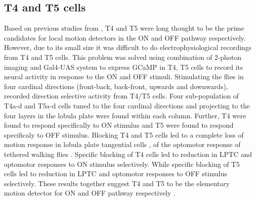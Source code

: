 \subsection{T4 and T5 cells}
Based on previous studies from \parencite{Fischbach1989, Buchner1984}, T4 and T5 were long thought to be the prime candidates for local motion detectors in the ON and OFF pathway respectively. However, due to its small size it was difficult to do electrophysiological recordings from T4 and T5 cells. This problem was solved using combination of 2-photon imaging and Gal4-UAS system to express GCaMP in T4, T5 cells to record its neural activity in response to the ON and OFF stimuli. Stimulating the flies in four cardinal directions (front-back, back-front, upwards and downwards), \cite{Maisak2013} recorded direction selective activity from T4/T5 cells. Four sub-population of T4a-d and T5a-d cells tuned to the four cardinal directions and projecting to the four layers in the lobula plate were found within each column. Further, T4 were found to respond specifically to ON stimulus and T5 were found to respond specificaly to OFF stimulus. Blocking T4 and T5 cells led to a complete loss of motion response in lobula plate tangential cells \parencite{Schnell2012}, of the optomotor response of tethered walking flies \parencite{Bahl2013}. Specific blocking of T4 cells led to reduction in LPTC and optomotor responses to ON stimulus selectively. While specific blocking of T5 cells led to reduction in LPTC and optomotor responses to OFF stimulus selectively. These results together suggest T4 and T5 to be the elementary motion detector for ON and OFF pathway respectively \parencite{Maisak2013}.      

